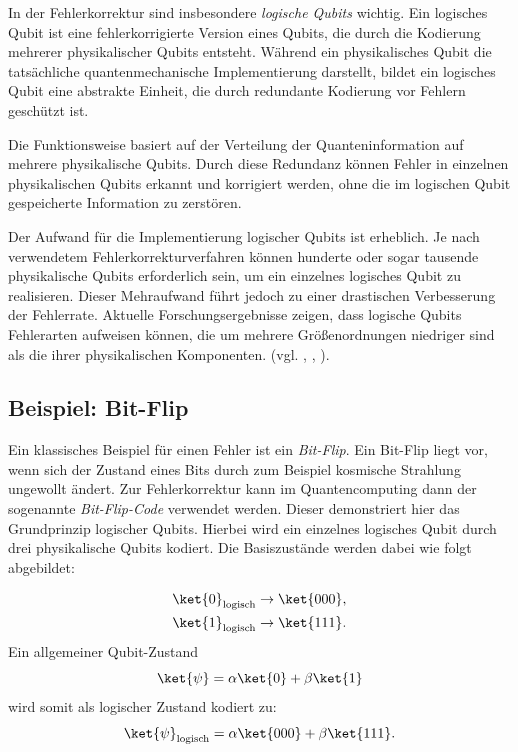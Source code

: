 In der Fehlerkorrektur sind insbesondere \emph{logische Qubits} wichtig. Ein logisches Qubit ist eine fehlerkorrigierte Version eines Qubits, die durch die Kodierung mehrerer physikalischer Qubits entsteht. Während ein physikalisches Qubit die tatsächliche quantenmechanische Implementierung darstellt, bildet ein logisches Qubit eine abstrakte Einheit, die durch redundante Kodierung vor Fehlern geschützt ist.

Die Funktionsweise basiert auf der Verteilung der Quanteninformation auf mehrere physikalische Qubits. Durch diese Redundanz können Fehler in einzelnen physikalischen Qubits erkannt und korrigiert werden, ohne die im logischen Qubit gespeicherte Information zu zerstören. 

Der Aufwand für die Implementierung logischer Qubits ist erheblich. Je nach verwendetem Fehlerkorrekturverfahren können hunderte oder sogar tausende physikalische Qubits erforderlich sein, um ein einzelnes logisches Qubit zu realisieren. Dieser Mehraufwand führt jedoch zu einer drastischen Verbesserung der Fehlerrate. Aktuelle Forschungsergebnisse zeigen, dass logische Qubits Fehlerarten aufweisen können, die um mehrere Größenordnungen niedriger sind als die ihrer physikalischen Komponenten. (vgl. \cite{divincenzoTopicsQuantumComputers1996}, \cite[426 ff.]{nielsen_quantum_2010}, \cite{ibm_research_team_introduction_nodate}).


\subsection{Beispiel: Bit-Flip}
Ein klassisches Beispiel für einen Fehler ist ein \emph{Bit-Flip}. Ein Bit-Flip liegt vor, wenn sich der Zustand eines Bits durch zum Beispiel kosmische Strahlung ungewollt ändert. Zur Fehlerkorrektur kann im Quantencomputing dann der sogenannte \emph{Bit-Flip-Code} verwendet werden. Dieser demonstriert hier das Grundprinzip logischer Qubits. Hierbei wird ein einzelnes logisches Qubit durch drei physikalische Qubits kodiert. Die Basiszustände werden dabei wie folgt abgebildet:

\begin{align}
\ket{0}_\text{logisch} &\rightarrow \ket{000}, \\
\ket{1}_\text{logisch} &\rightarrow \ket{111}.
\end{align}
Ein allgemeiner Qubit-Zustand
\begin{equation}
\ket{\psi} = \alpha \ket{0} + \beta \ket{1}
\end{equation}
wird somit als logischer Zustand kodiert zu:
\begin{equation}
\ket{\psi}_\text{logisch} = \alpha \ket{000} + \beta \ket{111}.
\end{equation}

